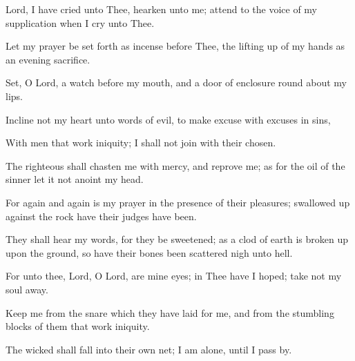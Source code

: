Lord, I have cried unto Thee, hearken unto me; attend to the voice of my supplication when I cry unto Thee.

Let my prayer be set forth as incense before Thee, the lifting up of my hands as an evening sacrifice.

Set, O Lord, a watch before my mouth, and a door of enclosure round about my lips.

Incline not my heart unto words of evil, to make excuse with excuses in sins,

With men that work iniquity; I shall not join with their chosen.

The righteous shall chasten me with mercy, and reprove me; as for the oil of the sinner let it not anoint my head.

For again and again is my prayer in the presence of their pleasures; swallowed up against the rock have their judges have been.

They shall hear my words, for they be sweetened; as a clod of earth is broken up upon the ground, so have their bones been scattered nigh unto hell.

For unto thee, Lord, O Lord, are mine eyes; in Thee have I hoped; take not my soul away.

Keep me from the snare which they have laid for me, and from the stumbling blocks of them that work iniquity.

The wicked shall fall into their own net; I am alone, until I pass by.
